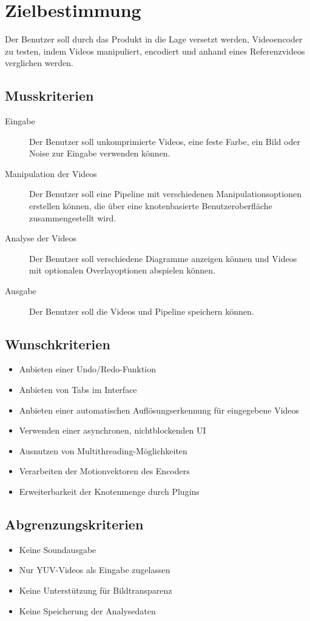 \renewcommand{\labelitemi}{$-$}
\section{Zielbestimmung}

Der Benutzer soll durch das Produkt in die Lage versetzt werden, Videoencoder zu testen, indem Videos manipuliert, encodiert und anhand eines Referenzvideos verglichen werden.

\subsection{Musskriterien}

\begin{description}
	\item[Eingabe] Der Benutzer soll unkomprimierte Videos, eine feste Farbe, ein Bild oder Noise zur Eingabe verwenden können.
	\item[Manipulation der Videos] Der Benutzer soll eine Pipeline mit verschiedenen Manipulationsoptionen erstellen können, die über eine knotenbasierte Benutzeroberfläche zusammengestellt wird.
	\item[Analyse der Videos] Der Benutzer soll verschiedene Diagramme anzeigen können und Videos mit optionalen Overlayoptionen abspielen können.
	\item[Ausgabe] Der Benutzer soll die Videos und Pipeline speichern können.
\end{description}

\subsection{Wunschkriterien}

\begin{itemize}
	\item Anbieten einer Undo/Redo-Funktion
	\item Anbieten von Tabs im Interface
	\item Anbieten einer automatischen Auflösungserkennung für eingegebene Videos
	\item Verwenden einer asynchronen, nichtblockenden UI
	\item Ausnutzen von Multithreading-Möglichkeiten
	\item Verarbeiten der Motionvektoren des Encoders
	\item Erweiterbarkeit der Knotenmenge durch Plugins
\end{itemize}

\subsection{Abgrenzungskriterien}

\begin{itemize}
	\item Keine Soundausgabe
	\item Nur YUV-Videos als Eingabe zugelassen
    \item Keine Unterstützung für Bildtransparenz
	\item Keine Speicherung der Analysedaten
\end{itemize}

